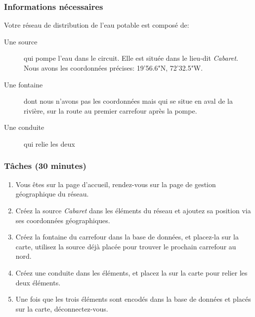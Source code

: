 \documentclass[a4paper, 11pt]{article}
\begin{document}
    \subsubsection*{Informations nécessaires}
        Votre réseau de distribution de l'eau potable est composé de:
        \begin{description}
            \item[Une source] qui pompe l'eau dans le circuit. Elle est située dans le lieu-dit \emph{Cabaret}. Nous avons les coordonnées précises: 19'56.6"N, 72'32.5"W.
            \item[Une fontaine] dont nous n'avons pas les coordonnées mais qui se situe en aval de la rivière, sur la route au premier carrefour après la pompe.
            \item[Une conduite] qui relie les deux
        \end{description}

    \subsubsection*{Tâches (30 minutes)}
        \begin{enumerate}
            \item Vous êtes sur la page d'accueil, rendez-vous sur la page de gestion géographique du réseau.
            \item Créez la source \emph{Cabaret} dans les éléments du réseau et ajoutez sa position via ses coordonnées géographiques.
            \item Créez la fontaine du carrefour dans la base de données, et placez-la sur la carte, utilisez la source déjà placée pour trouver le prochain carrefour au nord.
            \item Créez une conduite dans les éléments, et placez la sur la carte pour relier les deux éléments.
            \item Une fois que les trois éléments sont encodés dans la base de données et placés sur la carte, déconnectez-vous.
        \end{enumerate}

\newpage
\end{document}
